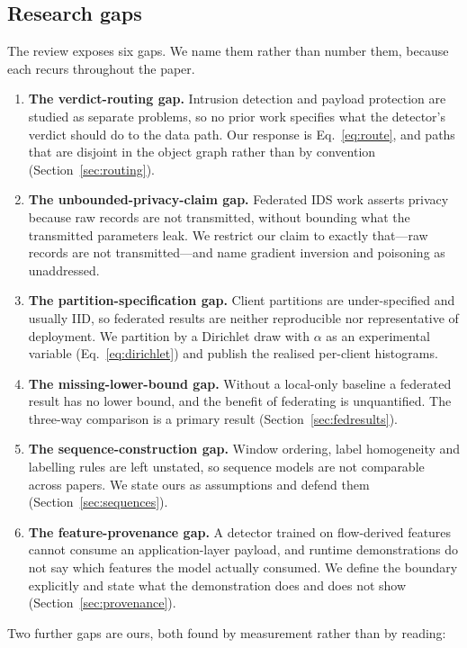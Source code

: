 \documentclass[conference]{IEEEtran}
\begin{document}
\subsection{Research gaps}\label{sec:gaps}
The review exposes six gaps. We name them rather than number them, because each recurs
throughout the paper.

\begin{enumerate}
  \item \textbf{The verdict-routing gap.} Intrusion detection and payload protection are studied
  as separate problems, so no prior work specifies what the detector's verdict should do to the
  data path. Our response is Eq.~\eqref{eq:route}, and paths that are disjoint in the object
  graph rather than by convention (Section~\ref{sec:routing}).
  \item \textbf{The unbounded-privacy-claim gap.} Federated IDS work asserts privacy because raw
  records are not transmitted, without bounding what the transmitted parameters leak. We restrict
  our claim to exactly that---raw records are not transmitted---and name gradient inversion and
  poisoning as unaddressed.
  \item \textbf{The partition-specification gap.} Client partitions are under-specified and
  usually IID, so federated results are neither reproducible nor representative of deployment.
  We partition by a Dirichlet draw with $\alpha$ as an experimental variable
  (Eq.~\eqref{eq:dirichlet}) and publish the realised per-client histograms.
  \item \textbf{The missing-lower-bound gap.} Without a local-only baseline a federated result
  has no lower bound, and the benefit of federating is unquantified. The three-way comparison is
  a primary result (Section~\ref{sec:fedresults}).
  \item \textbf{The sequence-construction gap.} Window ordering, label homogeneity and labelling
  rules are left unstated, so sequence models are not comparable across papers. We state ours as
  assumptions and defend them (Section~\ref{sec:sequences}).
  \item \textbf{The feature-provenance gap.} A detector trained on flow-derived features cannot
  consume an application-layer payload, and runtime demonstrations do not say which features the
  model actually consumed. We define the boundary explicitly and state what the demonstration
  does and does not show (Section~\ref{sec:provenance}).
\end{enumerate}

Two further gaps are ours, both found by measurement rather than by reading:
\end{document}
